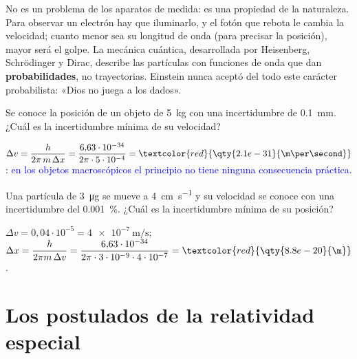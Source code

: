 No es un problema de los aparatos de medida: es una propiedad de la naturaleza. Para observar un electrón hay que iluminarlo, y el fotón
que rebota le cambia la velocidad; cuanto menor sea su longitud de onda (para precisar la posición), mayor será el golpe. La mecánica
cuántica, desarrollada por Heisenberg, Schrödinger y Dirac, describe las partículas con funciones de onda que dan
\textbf{probabilidades}, no trayectorias. Einstein nunca aceptó del todo este carácter probabilista: «Dios no juega a los dados».

\begin{exercise}
    Se conoce la posición de un objeto de \qty{5}{\kg} con una incertidumbre de \qty{0.1}{\mm}. ¿Cuál es la incertidumbre mínima de su velocidad?
    \begin{solu}
        \(\Delta v = \dfrac{h}{2\pi\,m\,\Delta x} = \dfrac{6{,}63\cdot 10^{-34}}{2\pi\cdot 5\cdot 10^{-4}} = \textcolor{red}{\qty{2.1e-31}{\m\per\second}}\):
        \textcolor{blue}{en los objetos macroscópicos el principio no tiene ninguna consecuencia práctica.}
    \end{solu}
\end{exercise}

\begin{exercise}
    Una partícula de \qty{3}{\micro\g} se mueve a \qty{4}{\cm\per\second} y su velocidad se conoce con una incertidumbre del \qty{0.001}{\percent}.
    ¿Cuál es la incertidumbre mínima de su posición?
    \begin{solu}
        \(\Delta v = 0{,}04\cdot 10^{-5} = \qty{4e-7}{\m\per\second}\);
        \(\Delta x = \dfrac{h}{2\pi m\,\Delta v} = \dfrac{6{,}63\cdot 10^{-34}}{2\pi\cdot 3\cdot 10^{-9}\cdot 4\cdot 10^{-7}} = \textcolor{red}{\qty{8.8e-20}{\m}}\).
    \end{solu}
\end{exercise}

\section{Los postulados de la relatividad especial}\label{sec:cua-relatividad}

